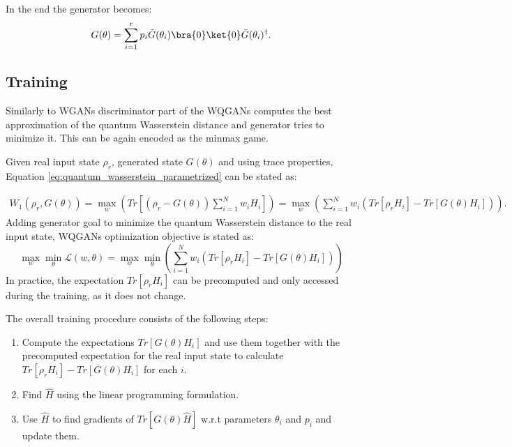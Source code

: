 In the end the generator becomes:
\begin{equation}
  G(\theta) = \sum_{i=1}^r p_i\bar{G}(\theta_i)\bra{0}\ket{0}\bar{G}(\theta_i)^\dagger.
\end{equation}



\subsection{Training}
Similarly to WGANs discriminator part of the WQGANs computes the best
approximation of the quantum Wasserstein distance and generator tries to
minimize it. This can be again encoded as the minmax game.

Given real input state $\rho_r$, generated state $G(\theta)$ and using trace
properties, Equation \ref{eq:quantum_wasserstein_parametrized} can be stated as:

\begin{equation}
  \label{eq:quantum_wasserstein_separated_trace}
  \begin{split}
    W_1(\rho_r, G(\theta)) = \max_{w}{(Tr[(\rho_r - G(\theta))\sum_{i=1}^N w_iH_i])} = \max_{w}{(\sum_{i=1}^Nw_i(Tr[\rho_rH_i] - Tr[G(\theta)H_i]))}.
  \end{split}
\end{equation}
Adding generator goal to minimize the quantum Wasserstein distance to the real
input state, WQGANs optimization objective is stated as:
\begin{equation}
  \max_{w}{\min_{\theta}{\mathcal{L}(w, \theta)}} = \max_{w}{\min_{\theta}{(\sum_{i=1}^Nw_i(Tr[\rho_rH_i] - Tr[G(\theta)H_i]))}} 
  \label{eq:wqgans_optimization_objective}
\end{equation}
In practice, the expectation $Tr[\rho_rH_i]$ can be precomputed and only
accessed during the training, as it does not change.

The overall training procedure consists of the following steps:
\begin{enumerate}
\item Compute the expectations $Tr[G(\theta)H_i]$ and use them together with
  the precomputed expectation for the real input state to calculate $Tr[\rho_rH_i] -
  Tr[G(\theta)H_i]$ for each $i$.
\item Find $\hat{H}$ using the linear programming formulation.
\item Use $\hat{H}$ to find gradients of $Tr[G(\theta)\hat{H}]$ w.r.t parameters
  $\theta_i$ and $p_i$ and update them.
\end{enumerate}

